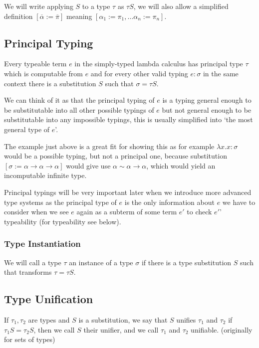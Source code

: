 We will write applying $S$ to a type $\tau$ as $\tau S$, we will also allow a simplified definition $[\overline{\alpha} := \overline{\pi}]$ meaning $[\alpha_1 := \pi_1, \dots \alpha_n := \pi_n]$.

\subsection{Principal Typing}

Every typeable term $e$ in the simply-typed lambda calculus has principal type $\tau$ \cite{barendregt1992lambda} which is computable from $e$ and for every other valid typing $e : \sigma$ in the same context there is a substitution $S$ such that $\sigma = \tau S$.

We can think of it as that the principal typing of $e$ is a typing general enough to be substitutable into all other possible typings of $e$ but not general enough to be substitutable into any impossible typings, this is usually simplified into `the most general type of $e$'.

The example just above is a great fit for showing this as for example $\lambda x . x : \sigma$ would be a possible typing, but not a principal one, because substitution $[\sigma := \alpha \rightarrow \alpha \rightarrow \alpha]$ would give use $\alpha \sim \alpha \rightarrow \alpha$, which would yield an incomputable infinite type.

Principal typings will be very important later when we introduce more advanced type systems as the principal type of $e$ is the only information about $e$ we have to consider when we see $e$ again as a subterm of some term $e'$ to check $e'$' typeability (for typeability see below). %

\subsubsection{Type Instantiation}

We will call a type $\tau$ an instance of a type $\sigma$ if there is a type substitution $S$ such that transforms $\tau = \tau S$.

\subsection{Type Unification}

If $\tau_1, \tau_2$ are types and $S$ is a substitution, we say that $S$ unifies $\tau_1$ and $\tau_2$ if $\tau_1 S = \tau_2 S$, then we call $S$ their unifier, and we call $\tau_1$ and $\tau_2$ unifiable. \cite{robinson1965machine} (originally for sets of types)

